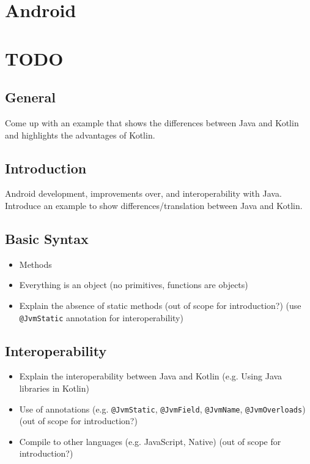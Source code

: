 \documentclass[a4paper, 11pt]{article}
\begin{document}
\section{Android}

\section{TODO}
\subsection{General}
  Come up with an example that shows the differences between Java and Kotlin and highlights the advantages of Kotlin.

\subsection{Introduction}
  Android development, improvements over, and interoperability with Java.
  Introduce an example to show differences/translation between Java and Kotlin.

\subsection{Basic Syntax}
\begin{itemize}
  \item Methods
  \item Everything is an object (no primitives, functions are objects)
  \item Explain the absence of static methods (out of scope for introduction?) (use \texttt{@JvmStatic} annotation for interoperability)
\end{itemize}

\subsection{Interoperability}
  \begin{itemize}
    \item Explain the interoperability between Java and Kotlin (e.g. Using Java libraries in Kotlin)
    \item Use of annotations (e.g. \texttt{@JvmStatic}, \texttt{@JvmField}, \texttt{@JvmName}, \texttt{@JvmOverloads}) (out of scope for introduction?)
    \item Compile to other languages (e.g. JavaScript, Native) (out of scope for introduction?)
  \end{itemize}
\end{document}
